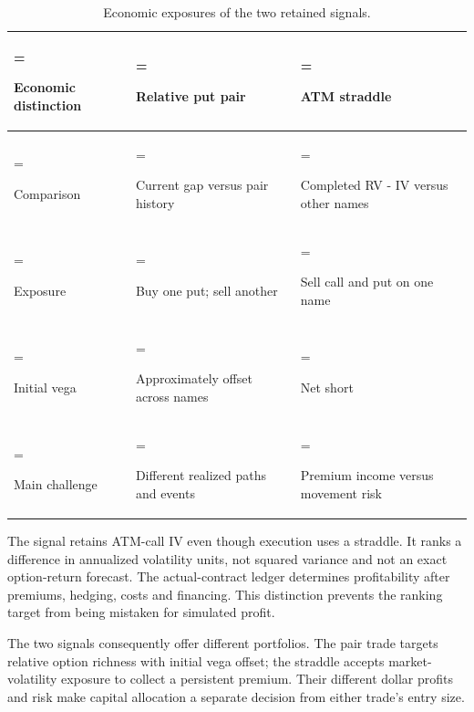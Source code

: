 \begin{table}[H]\centering\small
\caption{Economic exposures of the two retained signals.}
\setlength{\tabcolsep}{4pt}\renewcommand{\arraystretch}{1.18}
\begin{tabularx}{\textwidth}{@{}>{\hsize=0.80859\hsize\linewidth=\hsize\raggedright\arraybackslash}X>{\hsize=1.09570\hsize\linewidth=\hsize\raggedright\arraybackslash}X>{\hsize=1.09570\hsize\linewidth=\hsize\raggedright\arraybackslash}X@{}}\toprule
\textbf{Economic distinction} & \textbf{Relative put pair} & \textbf{ATM straddle}\\\midrule
Comparison & Current gap versus pair history & Completed RV - IV versus other names\\
Exposure & Buy one put; sell another & Sell call and put on one name\\
Initial vega & Approximately offset across names & Net short\\
Main challenge & Different realized paths and events & Premium income versus movement risk\\
\bottomrule\end{tabularx}\end{table}

The signal retains ATM-call IV even though execution uses a straddle. It ranks a difference in annualized volatility units, not squared variance and not an exact option-return forecast. The actual-contract ledger determines profitability after premiums, hedging, costs and financing. This distinction prevents the ranking target from being mistaken for simulated profit.


The two signals consequently offer different portfolios. The pair trade targets relative option richness with initial vega offset; the straddle accepts market-volatility exposure to collect a persistent premium. Their different dollar profits and risk make capital allocation a separate decision from either trade's entry size.
